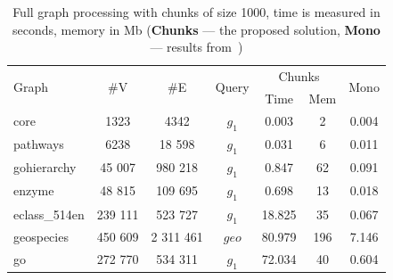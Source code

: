 {\setlength{\tabcolsep}{0.25em}
\begin{table}
{
\caption{Full graph processing with chunks of size 1000, time is measured in seconds, memory in Mb ({\textbf{Chunks} --- the proposed solution, \textbf{Mono} --- results from~\cite{10.1145/3398682.3399163})}}
\label{tbl:redis_full_graph_processing}
\small
{}
\begin{tabular}{|l|c|c|c|c|c|c|}
\hline
\multirow{2}{*}{Graph} & \multirow{2}{*}{\#V} & \multirow{2}{*}{\#E} & \multirow{2}{*}{Query} & \multicolumn{2}{c|}{Chunks}  &  \multirow{2}{*}{Mono}  \\
                       &                      &                      &                        & Time   & Mem & \\
\hline
\hline
core                   & 1323                 & 4342                 & $g_1$                  & 0.003  & 2                  &  0.004 \\
pathways               & 6238                 & 18 598               & $g_1$                  & 0.031  & 6                  &  0.011 \\
gohierarchy            & 45 007               & 980 218              & $g_1$                  & 0.847  & 62                  &  0.091 \\
enzyme                 & 48 815               & 109 695              & $g_1$                  & 0.698  & 13                  &  0.018 \\
eclass\_514en          & 239 111              & 523 727              & $g_1$                  & 18.825 & 35                   &  0.067 \\
geospecies             & 450 609              & 2 311 461            & $geo$                  & 80.979 & 196                  &  7.146 \\
go                     & 272 770              & 534 311              & $g_1$                  & 72.034 & 40                  &  0.604 \\
\hline
\end{tabular}
}
\end{table}
}

